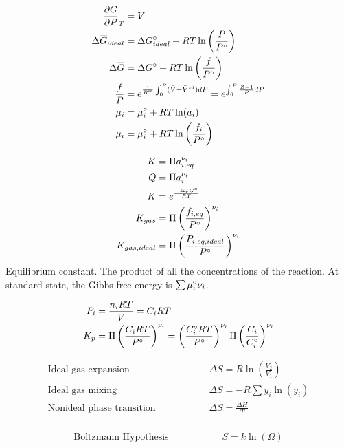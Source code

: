 \documentclass[10pt]{article} %
\begin{document}
\begin{align*}
  \frac{\partial G}{\partial P}_T &= V\\
  \Delta \overline{G}_{ideal} &= \Delta G_{ideal}\degree + RT\ln\left(\frac{P}{P\degree}\right)\\
  \Delta \overline{G} &= \Delta G\degree + RT\ln\left(\frac{f}{P\degree}\right)\\
  \frac{f}{P} &= e^{\frac{1}{RT}\int_0^P(\bar{V}-\bar{V}^{id})dP} = e^{\int_0^P\frac{Z-1}{P}dP}\\
  \mu_i &= \mu_i\degree + RT\ln(a_i)\\
  \mu_i &= \mu_i\degree + RT\ln\left(\frac{f_i}{P\degree}\right)\\
\end{align*}

\begin{align*}
  K &= \Pi a_{i,eq}^{\nu_i}\\
  Q &= \Pi a_{i}^{\nu_i}\\
  K &= e^{\frac{-\Delta_r G\degree}{RT}}\\
  K_{gas} &= \Pi\left(\frac{f_{i,eq}}{P\degree}\right)^{\nu_i}\\
  K_{gas,ideal} &= \Pi\left(\frac{P_{i,eq,ideal}}{P\degree}\right)^{\nu_i}\\
\end{align*}
Equilibrium constant. The product of all the concentrations of the reaction. At standard state, the Gibbs free energy is $\sum \mu_i\degree\nu_i$.

\begin{align*}
  P_i &= \frac{n_iRT}{V} = C_iRT\\
  K_p &= \Pi \left(\frac{C_iRT}{P\degree}\right)^{\nu_i} = \left(\frac{C_i\degree RT}{P\degree}\right)^{\nu_i} \Pi \left(\frac{C_i}{C_i\degree}\right)^{\nu_i}\\
\end{align*}

\begin{align*}
  \mbox{Ideal gas expansion}&\hspace{2cm}\Delta S = R\ln(\frac{V_2}{V_1})\\
  \mbox{Ideal gas mixing}&\hspace{2cm}\Delta S = -R\sum y_i\ln(y_i)\\
  \mbox{Nonideal phase transition}&\hspace{2cm} \Delta S = \frac{\Delta H}{T}\\
\end{align*}

\begin{align*}
  \mbox{Boltzmann Hypothesis}&\hspace{2cm} S = k\ln(\Omega)\\
\end{align*}
\end{document}
